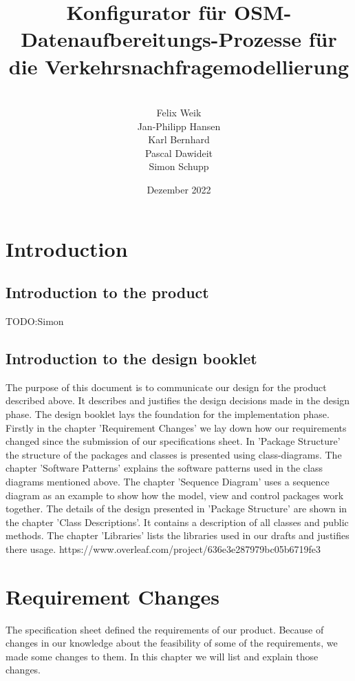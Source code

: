 \documentclass[parskip=full]{scrartcl} %
\title{Konfigurator für OSM-Datenaufbereitungs-Prozesse für die Verkehrsnachfragemodellierung \\}
\author{
\vspace{5mm}\\
Felix Weik\\ Jan-Philipp Hansen\\ Karl Bernhard\\ Pascal Dawideit\\ Simon Schupp}
\date{Dezember 2022}
\begin{document}
\maketitle
\newpage

\tableofcontents

\newpage

\section{Introduction}
\subsection{Introduction to the product}
TODO:Simon

\subsection{Introduction to the design booklet}
The purpose of this document is to communicate our design for the product described above. It describes and justifies the design decisions made in the design phase. The design booklet lays the foundation for the implementation phase.\\
Firstly in the chapter 'Requirement Changes' we lay down how our requirements changed since the submission of our specifications sheet. In 'Package Structure' the structure of the packages and classes is presented using class-diagrams. The chapter 'Software Patterns' explains the software patterns used in the class diagrams mentioned above. The chapter 'Sequence Diagram' uses a sequence diagram as an example to show how the model, view and control packages work together. The details of the design presented in 'Package Structure' are shown in the chapter 'Class Descriptions'. It contains a description of all classes and public methods. The chapter 'Libraries' lists the libraries used in our drafts and justifies there usage.
\newpage
https://www.overleaf.com/project/636e3e287979bc05b6719fe3




\section{Requirement Changes}
The specification sheet defined the requirements of our product. Because of changes in our knowledge about the feasibility of some of the requirements, we made some changes to them. In this chapter we will list and explain those changes.
\end{document}
